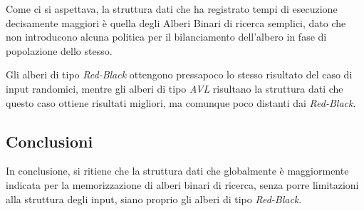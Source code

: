 \documentclass[11pt,a4paper,italian]{article}
\begin{document}
Come ci si aspettava, la struttura dati che ha registrato tempi di esecuzione decisamente maggiori è quella degli Alberi Binari di ricerca semplici, dato che non introducono alcuna politica per il bilanciamento dell'albero in fase di popolazione dello stesso.

Gli alberi di tipo \textit{Red-Black} ottengono pressapoco lo stesso risultato del caso di input randomici, mentre gli alberi di tipo \textit{AVL} risultano la struttura dati che questo caso ottiene risultati migliori, ma comunque poco distanti dai \textit{Red-Black}.

\subsection{Conclusioni}
In conclusione, si ritiene che la struttura dati che globalmente è maggiormente indicata per la memorizzazione di alberi binari di ricerca, senza porre limitazioni alla struttura degli input, siano proprio gli alberi di tipo \textit{Red-Black}.
\end{document}
